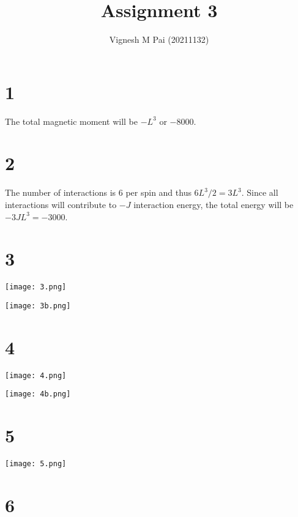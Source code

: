 \documentclass{article}
\title{Assignment 3}
\author{Vignesh M Pai (20211132)}
\date{}
\begin{document}
\maketitle

\section*{1}

The total magnetic moment will be $-L^3$ or $-8000$.

\section*{2}

The number of interactions is $6$ per spin and thus $6L^3 / 2 = 3 L^3$.
Since all interactions will contribute to $-J$ interaction energy, the total energy will be $-3 J L^3 = -3000$.

\section*{3}

\begin{center}
    \texttt{[image: 3.png]}
\end{center}

\begin{center}
    \texttt{[image: 3b.png]}
\end{center}

\section*{4}

\begin{center}
    \texttt{[image: 4.png]}
\end{center}

\begin{center}
    \texttt{[image: 4b.png]}
\end{center}

\section*{5}

\begin{center}
    \texttt{[image: 5.png]}
\end{center}

\section*{6}
\end{document}
